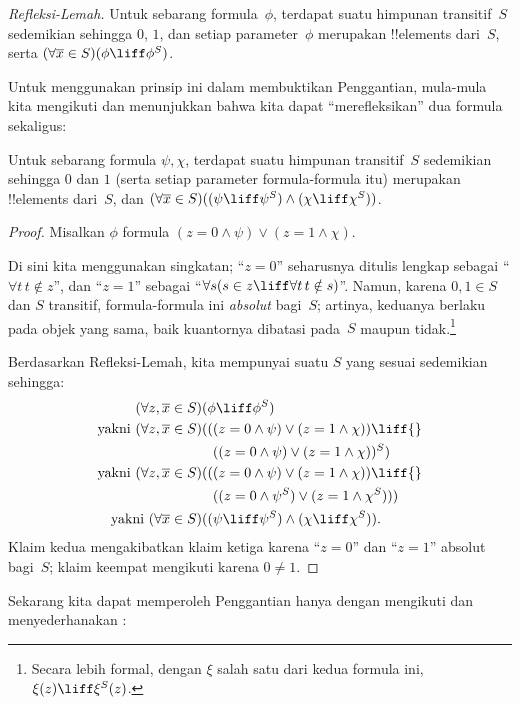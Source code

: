 \documentclass[../../../include/open-logic-section]{subfiles}
\begin{document}
\begin{defish}
\emph{Refleksi-Lemah.} Untuk sebarang formula~$\phi$, terdapat suatu himpunan
transitif~$S$ sedemikian sehingga $0$, $1$, dan setiap parameter~$\phi$
merupakan !!{element}s dari~$S$, serta
$(\forall\overline{x}\in S)(\phi\liff\phi^S)$.
\end{defish}

Untuk menggunakan prinsip ini dalam membuktikan Penggantian, mula-mula kita
mengikuti \citet[bagian pertama Teorema 2]{Levy1960} dan menunjukkan bahwa
kita dapat ``merefleksikan'' dua formula sekaligus:

\begin{lem}
Untuk sebarang formula $\psi,\chi$, terdapat suatu himpunan transitif~$S$
sedemikian sehingga $0$ dan $1$ (serta setiap parameter formula-formula itu)
merupakan !!{element}s dari~$S$, dan
$(\forall\overline{x}\in S)((\psi\liff\psi^S)\land
(\chi\liff\chi^S))$.
\end{lem}

\begin{proof}
Misalkan $\phi$ formula $(z=0\land\psi)\lor(z=1\land\chi)$.

Di sini kita menggunakan singkatan; ``$z=0$'' seharusnya ditulis lengkap
sebagai ``$\forall t\,t\notin z$'', dan ``$z=1$'' sebagai
``$\forall s(s\in z\liff\forall t\,t\notin s)$''. Namun, karena
$0,1\in S$ dan $S$ transitif, formula-formula ini \emph{absolut} bagi~$S$;
artinya, keduanya berlaku pada objek yang sama, baik kuantornya dibatasi
pada~$S$ maupun tidak.\footnote{Secara lebih formal, dengan $\xi$ salah satu
dari kedua formula ini, $\xi(z)\liff\xi^S(z)$.}

Berdasarkan Refleksi-Lemah, kita mempunyai suatu $S$ yang sesuai sedemikian
sehingga:
\begin{align*}
	(\forall z, \overline{x} \in S)(&\phi \liff \phi^S)\\
	\text{yakni }(\forall z, \overline{x} \in S)(&((z = 0 \land \psi) \lor (z = 1 \land \chi)) \liff {}\\
	&\phantom{(}((z = 0 \land \psi) \lor (z = 1 \land \chi))^S)\\
	\text{yakni }(\forall z, \overline{x} \in S)(&((z = 0 \land \psi) \lor (z = 1 \land \chi))\liff {}\\
	&\phantom{(}((z = 0 \land \psi^S) \lor (z = 1 \land \chi^S)))\\
	\text{yakni }(\forall \overline{x} \in S)(&(\psi \liff \psi^S) \land (\chi \liff \chi^S)).
\end{align*}
Klaim kedua mengakibatkan klaim ketiga karena ``$z=0$'' dan ``$z=1$''
absolut bagi~$S$; klaim keempat mengikuti karena $0\neq1$.
\end{proof}\noindent
Sekarang kita dapat memperoleh Penggantian hanya dengan mengikuti dan
menyederhanakan \citet[Teorema 6]{Levy1960}:
\end{document}
